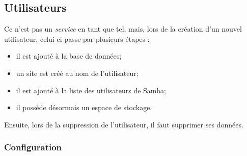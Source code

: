 \subsection{Utilisateurs}
\label{subsec:users}

Ce n'est pas un \emph{service} en tant que tel, mais, lors de la création d'un
nouvel utilisateur, celui-ci passe par plusieurs étapes :
\begin{itemize}

    \item il est ajouté à la base de données;
    \item un site est créé au nom de l'utilisateur;
    \item il est ajouté à la liste des utilisateurs de Samba;
    \item il possède désormais un espace de stockage.

\end{itemize}

Ensuite, lors de la suppression de l'utilisateur, il faut supprimer ses données.


\subsubsection{Configuration}
\label{subsubsec:configure}

